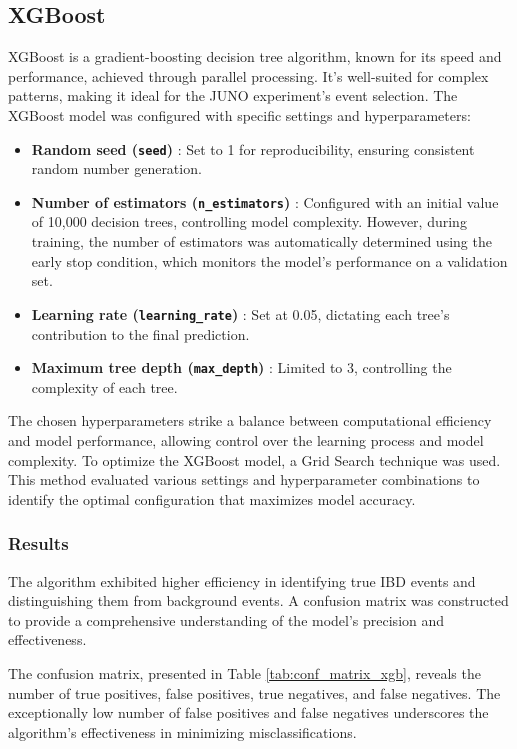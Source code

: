 \vspace{-1.5 cm}

\subsection{XGBoost}
XGBoost is a gradient-boosting decision tree algorithm, known for its speed and performance, achieved through parallel processing. It's well-suited for complex patterns, making it ideal for the JUNO experiment's event selection.
The XGBoost model was configured with specific settings and hyperparameters:

\begin{itemize}
	\item  \textbf{Random seed (\texttt{seed})} : Set to 1 for reproducibility, ensuring consistent random number generation.
	\item  \textbf{Number of estimators (\texttt{n\_{estimators}})} : Configured with an initial value of 10,000 decision trees, controlling model complexity. However, during training, the number of estimators was automatically determined using the early stop condition, which monitors the model's performance on a validation set.
	\item  \textbf{Learning rate (\texttt{learning\_rate})} : Set at 0.05, dictating each tree's contribution to the final prediction. 
	\item  \textbf{Maximum tree depth (\texttt{max\_depth})} : Limited to 3, controlling the complexity of each tree.
\end{itemize}
The chosen hyperparameters strike a balance between computational efficiency and model performance, allowing control over the learning process and model complexity. To optimize the XGBoost model, a Grid Search technique was used. This method evaluated various settings and hyperparameter combinations to identify the optimal configuration that maximizes model accuracy.



\subsubsection{Results}
The algorithm exhibited higher efficiency in identifying true IBD events and distinguishing them from background events. A confusion matrix was constructed to provide a comprehensive understanding of the model's precision and effectiveness.

The confusion matrix, presented in Table \ref{tab:conf_matrix_xgb}, reveals the number of true positives, false positives, true negatives, and false negatives. The exceptionally low number of false positives and false negatives underscores the algorithm's effectiveness in minimizing misclassifications.

